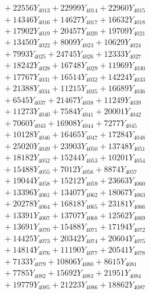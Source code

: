 \documentclass[a4paper,10pt]{article}
\begin{document}
{\begin{align}
&\;  + 22556 Y_{4013} + 22999 Y_{4014} + 22960 Y_{4015} \\[0.3ex]
&\;  + 14346 Y_{4016} + 14627 Y_{4017} + 16632 Y_{4018} \\[0.5ex]\allowbreak
&\;  + 17902 Y_{4019} + 20457 Y_{4020} + 19709 Y_{4021} \\[0.3ex]
&\;  + 13450 Y_{4022} + 8009 Y_{4023} + 10629 Y_{4024} \\[0.3ex]
&\;  + 7993 Y_{4025} + 24745 Y_{4026} + 12333 Y_{4027} \\[0.3ex]
&\;  + 18242 Y_{4028} + 16748 Y_{4029} + 11969 Y_{4030} \\[0.3ex]
&\;  + 17767 Y_{4031} + 16514 Y_{4032} + 14224 Y_{4033} \\[0.3ex]
&\;  + 21388 Y_{4034} + 11215 Y_{4035} + 16689 Y_{4036} \\[0.3ex]
&\;  + 6545 Y_{4037} + 21467 Y_{4038} + 11249 Y_{4039} \\[0.3ex]
&\;  + 11273 Y_{4040} + 7584 Y_{4041} + 20001 Y_{4042} \\[0.3ex]
&\;  + 7060 Y_{4043} + 16908 Y_{4044} + 7277 Y_{4045} \\[0.3ex]
&\;  + 10128 Y_{4046} + 16465 Y_{4047} + 17284 Y_{4048} \\[0.5ex]\allowbreak
&\;  + 25020 Y_{4049} + 23903 Y_{4050} + 13748 Y_{4051} \\[0.3ex]
&\;  + 18182 Y_{4052} + 15244 Y_{4053} + 10201 Y_{4054} \\[0.3ex]
&\;  + 15488 Y_{4055} + 7012 Y_{4056} + 8874 Y_{4057} \\[0.3ex]
&\;  + 19044 Y_{4058} + 15212 Y_{4059} + 23663 Y_{4060} \\[0.3ex]
&\;  + 13396 Y_{4061} + 13407 Y_{4062} + 18067 Y_{4063} \\[0.3ex]
&\;  + 20278 Y_{4064} + 16818 Y_{4065} + 23181 Y_{4066} \\[0.3ex]
&\;  + 13391 Y_{4067} + 13707 Y_{4068} + 12562 Y_{4069} \\[0.3ex]
&\;  + 13691 Y_{4070} + 15488 Y_{4071} + 17194 Y_{4072} \\[0.3ex]
&\;  + 14425 Y_{4073} + 20342 Y_{4074} + 20604 Y_{4075} \\[0.3ex]
&\;  + 14814 Y_{4076} + 11190 Y_{4077} + 20541 Y_{4078} \\[0.5ex]\allowbreak
&\;  + 7133 Y_{4079} + 10806 Y_{4080} + 8615 Y_{4081} \\[0.3ex]
&\;  + 7785 Y_{4082} + 15692 Y_{4083} + 21951 Y_{4084} \\[0.3ex]
&\;  + 19779 Y_{4085} + 21223 Y_{4086} + 18862 Y_{4087} \\[0.3ex]

\end{align}}
\end{document}
